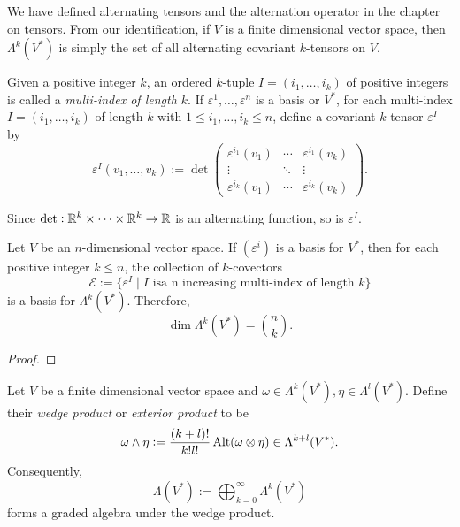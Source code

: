 We have defined alternating tensors and the alternation operator in the chapter on tensors. From our identification, if $V$ is a finite dimensional vector space, then $\Lambda^k(V^*)$ is simply the set of all alternating covariant $k$-tensors on $V$.

Given a positive integer $k$, an ordered $k$-tuple $I = (i_1,\dots,i_k)$ of positive integers is called a \emph{multi-index of length $k$}. If $\varepsilon^1,\dots,\varepsilon^n$ is a basis or $V^*$, for each multi-index $I = (i_1,\dots,i_k)$ of length $k$ with $1\le i_1,\dots,i_k\le n$, define a covariant $k$-tensor $\varepsilon^I$ by 
\begin{equation*}
    \varepsilon^I(v_1,\dots,v_k) := \det
    \begin{pmatrix}
        \varepsilon^{i_1}(v_1) & \cdots & \varepsilon^{i_1}(v_k)\\
        \vdots & \ddots & \vdots\\ 
        \varepsilon^{i_k}(v_1) & \cdots & \varepsilon^{i_k}(v_k)
    \end{pmatrix}.
\end{equation*}

Since $\det: \mathbb{R}^k\times\dots\times\mathbb{R}^k\to\mathbb{R}$ is an alternating function, so is $\varepsilon^I$.

\begin{proposition}
    Let $V$ be an $n$-dimensional vector space. If $(\varepsilon^i)$ is a basis for $V^*$, then for each positive integer $k\le n$, the collection of $k$-covectors 
    \begin{equation*}
        \mathscr E := \{\varepsilon^I\mid I\text{ isa n increasing multi-index of length }k\}
    \end{equation*}
    is a basis for $\Lambda^k(V^*)$. Therefore, 
    \begin{equation*}
        \dim\Lambda^k(V^*) = \binom{n}{k}.
    \end{equation*}
\end{proposition}
\begin{proof}
    
\end{proof}

\begin{definition}
    Let $V$ be a finite dimensional vector space and $\omega\in\Lambda^k(V^*), \eta\in\Lambda^l(V^*)$. Define their \emph{wedge product} or \emph{exterior product} to be 
    \begin{equation*}
        \omega\wedge\eta := \frac{(k + l)!}{k!l!}\operatorname{Alt}(\omega\otimes\eta)\in\Lambda^{k + l}(V^*).
    \end{equation*}
    Consequently, 
    \begin{equation*}
        \Lambda(V^*) := \bigoplus_{k = 0}^\infty\Lambda^k(V^*)
    \end{equation*}
    forms a graded algebra under the wedge product.
\end{definition}

